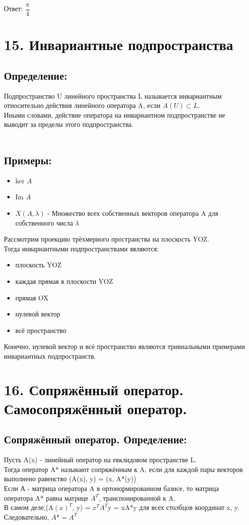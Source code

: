 \documentclass[12pt]{article}
\begin{document}
\begin{enumerate}
          Ответ: $\dfrac{\pi}{4}$
\end{enumerate}

\section{15. Инвариантные подпространства}
\subsection{Определение:}

Подпространство U линейного пространства L называется инвариантным относительно действия линейного оператора A, если $A(U)  \subset  L$.\\
Иными словами, действие оператора на инвариантном подпространстве не выводит за пределы этого подпространства.\\\\
\subsection{Примеры:}
\begin{itemize}
    \item ker $A$
    \item Im $A$
    \item $X(A,\lambda)$ - Множество всех собственных векторов оператора A для собственного числа $\lambda$
\end{itemize}
Рассмотрим проекцию трёхмерного пространства на плоскость YOZ.\\
Тогда инвариантными подпространствами являются:
\begin{itemize}
    \item плоскость YOZ
    \item каждая прямая в плоскости YOZ
    \item прямая OX
    \item нулевой вектор
    \item всё пространство
\end{itemize}
Конечно, нулевой вектор и всё пространство являются тривиальными примерами инвариантных подпространств.

\section{16. Сопряжённый оператор. Самосопряжённый оператор.}
\subsection{Сопряжённый оператор. Определение:}
Пусть A(x) - линейный оператор на евклидовом пространстве L.\\
Тогда оператор A* называют сопряжённым к A, если для каждой пары векторов выполнено равенство (A(x), y) = (x, A*(y))\\
Если А - матрица оператора A  в ортонормированном базисе, то матрица оператора A* равна матрице $A^T$, транспонированной к A.\\
В самом деле,(A$(x)^{T}$, y) = $x^T$$A^T$y = xA*y для всех столбцов координат x, y. \\
    Следовательно, $A* = A^T$
\end{document}

